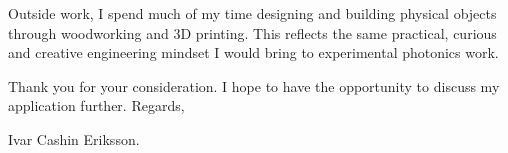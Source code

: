 \documentclass[11pt,a4paper]{moderncv}
\begin{document}
\hspace*{2em}
Outside work, I spend much of my time designing and building physical objects through woodworking and 3D printing. This reflects the same practical, curious and creative engineering mindset I would bring to experimental photonics work.

\vspace*{2em}
Thank you for your consideration. I hope to have the opportunity to discuss my application further. Regards,

\vspace*{1em}
Ivar Cashin Eriksson.
\end{document}
